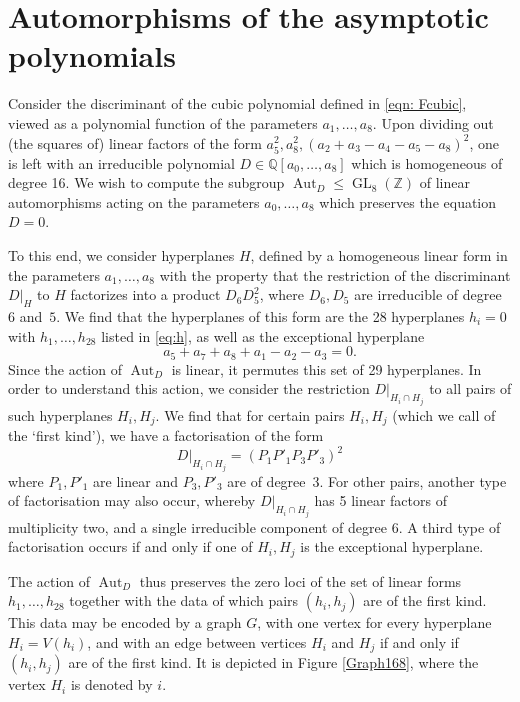 \documentclass[12pt,reqno]{amsart}
\theoremstyle{remark}
\begin{document}
\section{Automorphisms of the asymptotic polynomials}
\label{sec:Graph}
Consider the  discriminant of  the cubic polynomial defined in \eqref{eqn: Fcubic}, viewed as a  polynomial function of  the parameters $a_1,\dots, a_8$. Upon dividing out (the squares of) linear factors of the form $a^2_5, a^2_8,(a_2+a_3-a_4-a_5-a_8)^2$, one is left with an  irreducible polynomial $D\in \mathbb{Q}[a_0,\dots, a_8]$  which is homogeneous of degree 16. We wish to  compute the subgroup $\operatorname{Aut}_D \leq \operatorname{GL}_8(\mathbb{Z})$ of linear automorphisms  acting on the parameters $a_0,\dots,a_8$ which preserves  the equation $D=0$. 

To this end, we  consider hyperplanes $H$, defined by a  homogeneous linear form in the parameters $a_1,\dots, a_8$ with the property that the restriction of the discriminant $D\big|_H$ 
to $H$ factorizes  into a product  $D_6  D_5^2$, where  $D_6, D_5$ are irreducible of degree $6$ and~$5$. 
We find that the hyperplanes of this form are  the 28 hyperplanes $h_i=0$ with $h_1,\dots, h_{28}$ listed in \eqref{eq:h}, as well as the exceptional hyperplane 
\[ a_5 +a_7 +a_8 +a_1-a_2 -a_3 =0. \]
Since the action of $\operatorname{Aut}_D$ is linear, it  permutes this set of  29 hyperplanes. 
In order to understand this action, we consider the restriction $D|_{H_i\cap H_j}$ to all pairs of such hyperplanes $H_i,H_j$. We find that for certain pairs $H_i, H_j$ (which we call of the `first kind'), we have  a factorisation of the form
\[ D\big|_{H_i\cap H_j} = (P_1P'_1P_3P'_3)^2\]
where $P_1,P'_1$ are linear and $P_3,P'_3$ are of degree~$3$. For other pairs, another type of factorisation may also occur, whereby $D|_{H_i\cap H_j}$ has 5 linear factors of multiplicity two, and a single irreducible component of degree $6$. A third type of factorisation  occurs if and only if  one of  $H_i, H_j$ is the exceptional hyperplane.

The action of $\operatorname{Aut}_D$ thus preserves the zero loci of the set of linear forms  $h_1,\dots, h_{28}$ together with the data  of which pairs $(h_i,h_j)$  are of the first kind. 
This data may be encoded by a graph $G$, with one vertex for every hyperplane $H_i = V(h_i)$, and with an edge between vertices $H_i$ 
and $H_j$ if and only if $(h_i,h_j)$ are of the first kind. It is depicted in Figure \ref{Graph168}, where the vertex  $H_i$ is denoted by $i$.
\end{document}

